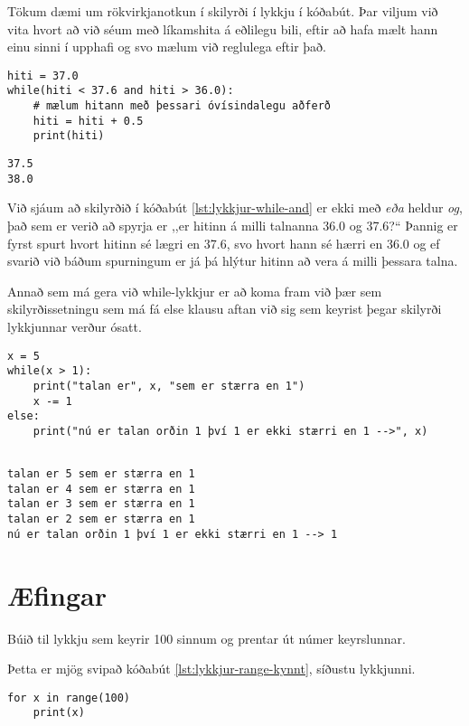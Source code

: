 Tökum dæmi um rökvirkjanotkun í skilyrði í lykkju í kóðabút.
Þar viljum við vita hvort að við séum með líkamshita á eðlilegu bili, eftir að hafa mælt hann einu sinni í upphafi og svo mælum við reglulega eftir það.

\begin{lstlisting}[caption=while-lykkja með og rökvirkjanum, label=lst:lykkjur-while-and]
hiti = 37.0
while(hiti < 37.6 and hiti > 36.0):
	# mælum hitann með þessari óvísindalegu aðferð
	hiti = hiti + 0.5
	print(hiti)
\end{lstlisting}
\lstset{style=uttak}
\begin{lstlisting}
37.5
38.0
\end{lstlisting}
\lstset{style=venjulegt}

Við sjáum að skilyrðið í kóðabút \ref{lst:lykkjur-while-and} er ekki með \emph{eða} heldur \emph{og}, það sem er verið að spyrja er ,,er hitinn á milli talnanna 36.0 og 37.6?“
Þannig er fyrst spurt hvort hitinn sé lægri en 37.6, svo hvort hann sé hærri en 36.0 og ef svarið við báðum spurningum er já þá hlýtur hitinn að vera á milli þessara talna. 

Annað sem má gera við while-lykkjur er að koma fram við þær sem skilyrðissetningu sem má fá else klausu aftan við sig sem keyrist þegar skilyrði lykkjunnar verður ósatt.

\begin{lstlisting}[caption=Að nota else með while, label=lst:lykkjur-while-else]
x = 5
while(x > 1):
	print("talan er", x, "sem er stærra en 1")
	x -= 1 
else:
	print("nú er talan orðin 1 því 1 er ekki stærri en 1 -->", x)
	
\end{lstlisting}
\lstset{style=uttak}
\begin{lstlisting}
talan er 5 sem er stærra en 1
talan er 4 sem er stærra en 1
talan er 3 sem er stærra en 1
talan er 2 sem er stærra en 1
nú er talan orðin 1 því 1 er ekki stærri en 1 --> 1
\end{lstlisting}
\lstset{style=venjulegt}



\newpage
\section{Æfingar}
\begin{exercise}\label{lyk1}
	Búið til lykkju sem keyrir 100 sinnum og prentar út númer keyrslunnar.
\end{exercise}
\begin{Answer}[ref={lyk1}]
Þetta er mjög svipað kóðabút \ref{lst:lykkjur-range-kynnt}, síðustu lykkjunni.
\begin{lstlisting}
for x in range(100)
	print(x)\end{lstlisting}
\end{Answer}

